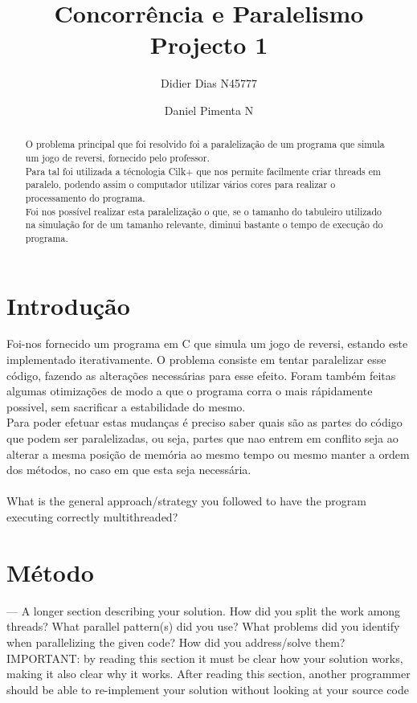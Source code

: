 \documentclass[a4paper]{article}
\title{Concorrência e Paralelismo \\
\large Projecto 1}
\author{Didier Dias N45777\and Daniel Pimenta N}
\begin{document}
\maketitle

\begin{abstract}
O problema principal que foi resolvido foi a paralelização de um programa que simula um jogo de reversi, fornecido pelo professor. \\
Para tal foi utilizada a técnologia Cilk+ que nos permite facilmente criar threads em paralelo, podendo assim o computador utilizar vários cores para realizar o processamento do programa.\\
Foi nos possível realizar esta paralelização o que, se o  tamanho do tabuleiro utilizado na simulação for de um tamanho relevante, diminui bastante o tempo de execução do programa.
\end{abstract}

\section{Introdução}

Foi-nos fornecido um programa em C que simula um jogo de reversi, estando este implementado iterativamente. O problema consiste em tentar paralelizar esse código, fazendo as alterações necessárias para esse efeito. Foram também feitas algumas otimizações de modo a que o programa corra o mais rápidamente possivel, sem sacrificar a estabilidade do mesmo.\\
Para poder efetuar estas mudanças é preciso saber quais são as partes do código que podem ser paralelizadas, ou seja, partes que nao entrem em conflito seja ao alterar a mesma posição de memória ao mesmo tempo ou mesmo manter a ordem dos métodos, no caso em que esta seja necessária.\\\\
What	is	the	general	
approach/strategy	you	 followed	 to	have	 the	program	executing	correctly	multithreaded?

\section{Método}
— A	longer	section	describing	your	solution.	How	did	you	split	the	work	
among	 threads?	What	parallel	pattern(s)	did	you	use?	 What	problems	did	you	
identify	 when	 parallelizing	 the	 given	 code?	 	 How	 did	 you	 address/solve	 them?	
IMPORTANT:	 by reading	 this	 section	 it	must	 be	 clear	 how	 your	 solution	works,	
making	it	also	clear	why	it	works.	After	reading	this	section,	another	programmer	
should	be	able	to	re-implement	your	solution	without	looking	at	your	source	code
\end{document}
